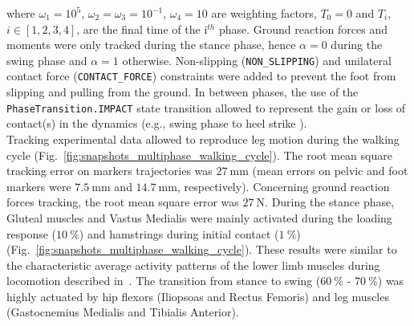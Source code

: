 \noindent where $\omega_1=10^5$, $\omega_2=\omega_3=10^{-1}$, $\omega_4=10$ are weighting factors, $T_0=0$ and $T_i$, $i \in [1, 2, 3, 4]$, are the final time of the i$^{th}$ phase. 
Ground reaction forces and moments were only tracked during the stance phase, hence $\alpha = 0$ during the swing phase and $\alpha = 1$ otherwise. 
Non-slipping (\texttt{NON\_SLIPPING}) and unilateral contact force (\texttt{CONTACT\_FORCE}) constraints were added to prevent the foot from slipping and pulling from the ground. 
In between phases, the use of the \texttt{PhaseTransition.IMPACT} state transition allowed to represent the gain or loss of contact(s) in the dynamics (e.g., \cite{felis_synthesis_2016} swing phase to heel strike ).\\
Tracking experimental data allowed to reproduce leg motion during the walking cycle (Fig.~\ref{fig:snapshots_multiphase_walking_cycle}). 
The root mean square tracking error on markers trajectories was $\SI{27}{\milli\meter}$ (mean errors on pelvic and foot markers were $\SI{7.5}{\milli\meter}$ and $\SI{14.7}{\milli\meter}$, respectively). 
Concerning ground reaction forces tracking, the root mean square error was $\SI{27}{\newton}$.
During the stance phase, Gluteal muscles and Vastus Medialis were mainly activated during the loading response ($\SI{10}{\percent}$) and hamstrings during initial contact ($\SI{1}{\percent}$) (Fig.~\ref{fig:snapshots_multiphase_walking_cycle}). 
These results were similar to the characteristic average activity patterns of the lower limb muscles during locomotion described in~\cite{winter_biomechanics_1991}. 
The transition from stance to swing ($\SI{60}{\percent}$ - $\SI{70}{\percent}$) was highly actuated by hip flexors (Iliopsoas and Rectus Femoris) and leg muscles (Gastocnemius Medialis and Tibialis Anterior).

